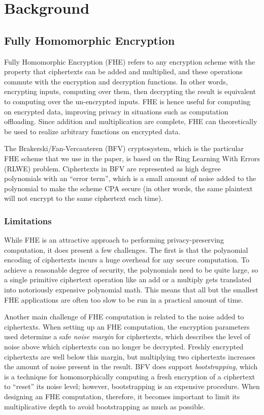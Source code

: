 \section{Background}\label{sec:background}
\subsection{Fully Homomorphic Encryption}
Fully Homomorphic Encryption (FHE) refers to any encryption scheme with the property that ciphertexts can be added and multiplied, and these operations commute with the encryption and decryption functions. In other words, encrypting inputs, computing over them, then decrypting the result is equivalent to computing over the un-encrypted inputs. FHE is hence useful for computing on encrypted data, improving privacy in situations such as computation offloading.
Since addition and multiplication are complete, FHE can theoretically be used to realize arbitrary functions on encrypted data.

The Brakerski/Fan-Vercauteren (BFV) \cite{BFV} cryptosystem, which is the particular FHE scheme that we use in the paper, is based on the Ring Learning With Errors (RLWE) problem.
Ciphertexts in BFV are represented as high degree polynomials with an ``error term'', which is a small amount of noise added to the polynomial to make the scheme CPA secure (in other words, the same plaintext will not encrypt to the same ciphertext each time).
\subsubsection{Limitations}
While FHE is an attractive approach to performing privacy-preserving computation, it does present a few challenges.
The first is that the polynomial encoding of ciphertexts incurs a huge overhead for any secure computation.
To achieve a reasonable degree of security, the polynomials need to be quite large, so a single primitive ciphertext operation like an add or a multiply gets translated into notoriously expensive polynomial math.
This means that all but the smallest FHE applications are often too slow to be run in a practical amount of time.

Another main challenge of FHE computation is related to the noise added to ciphertexts.
When setting up an FHE computation, the encryption parameters used determine a safe {\em noise margin} for ciphertexts, which describes the level of noise above which ciphertexts can no longer be decrypted.
Freshly encrypted ciphertexts are well below this margin, but multiplying two ciphertexts increases the amount of noise present in the result.
BFV does support {\em bootstrapping}, which is a technique for homomorphically computing a fresh encryption of a ciphertext to ``reset'' its noise level; however, bootstrapping is an expensive procedure.
When designing an FHE computation, therefore, it becomes important to limit its multiplicative depth to avoid bootstrapping as much as possible.

